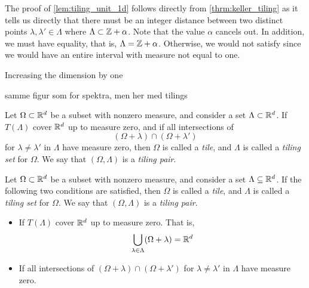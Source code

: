 \documentclass[../thesis.tex]{subfiles}
\begin{document}
The proof of \cref{lem:tiling_unit_1d} follows directly from \cref{thrm:keller_tiling} as it tells us directly that there must be an integer distance between two distinct points $\lambda,\lambda' \in \Lambda$ where $\Lambda \subset \mathbb{Z} +\alpha$. Note that the value $\alpha$ cancels out. In addition, we must have equality, that is, $\Lambda = \mathbb{Z} +\alpha$. Otherwise, we would not satisfy  since we would have an entire interval with measure not equal to one.

Increasing the dimension by one 


samme figur som for spektra, men her med tilings



\clearpage
{}
\begin{definition}
    Let $\Omega \subset \mathbb{R}^d$ be a subset with nonzero measure, and consider a set $\Lambda \subset \mathbb{R}^d$. If $T(\Lambda)$ cover $\mathbb{R}^d$ up to measure zero, and if all intersections of 
    \begin{equation*}  %
        (\Omega+\lambda) \cap (\Omega+\lambda')
    \end{equation*}
    for $\lambda\neq \lambda'$ in $\Lambda$ have measure zero, then $\Omega$ is called a \emph{tile}, and $\Lambda$ is called a \emph{tiling set} for $\Omega$. We say that $(\Omega, \Lambda)$ is a \emph{tiling pair}. 
\end{definition}
\begin{definition}
    Let $\Omega \subset \mathbb{R}^d$ be a subset with nonzero measure, and consider a set $\Lambda \subseteq \mathbb{R}^d$. If the following two conditions are satisfied, then $\Omega$ is called a \emph{tile}, and $\Lambda$ is called a \emph{tiling set} for $\Omega$. We say that $(\Omega, \Lambda)$ is a \emph{tiling pair}. 
    \begin{itemize}
        \item If $T(\Lambda)$ cover $\mathbb{R}^d$ up to measure zero. That is,  %
        \begin{equation*}
            \bigcup_{\lambda \in \Lambda} (\Omega + \lambda) = \mathbb{R}^d
        \end{equation*}
        \item If all intersections of $(\Omega+\lambda) \cap (\Omega+\lambda')$ for $\lambda\neq \lambda'$ in $\Lambda$ have measure zero. %
    \end{itemize}
\end{definition}
\end{document}
